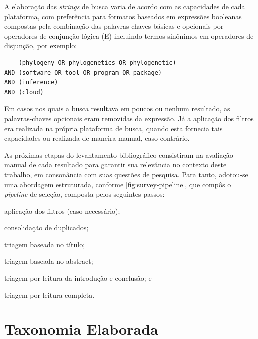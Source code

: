\documentclass[english,brazilian]{UNISINOSmonografia} %
\begin{document}
A elaboração das \textit{strings} de busca varia de acordo com as capacidades de cada plataforma, com preferência para formatos baseados em expressões booleanas compostas pela combinação das palavras-chaves básicas e opcionais por operadores de conjunção lógica (E) incluindo termos sinônimos em operadores de disjunção, por exemplo:
\begin{verbatim}
    (phylogeny OR phylogenetics OR phylogenetic) 
AND (software OR tool OR program OR package) 
AND (inference) 
AND (cloud)
\end{verbatim}
Em casos nos quais a busca resultava em poucos ou nenhum resultado, as palavras-chaves opcionais eram removidas da expressão.
Já a aplicação dos filtros era realizada na própria plataforma de busca, quando esta fornecia tais capacidades ou realizada de maneira manual, caso contrário.


%


As próximas etapas do levantamento bibliográfico consistiram na avaliação manual de cada resultado para garantir sua relevância no contexto deste trabalho, em consonância com suas questões de pesquisa.
Para tanto, adotou-se uma abordagem estruturada, conforme \autoref{fig:survey-pipeline}, que compôs o \textit{pipeline} de seleção, composta pelos seguintes passos:
\begin{inparaenum}[I)]
	\item aplicação dos filtros (caso necessário);
	\item consolidação de duplicados;
	\item triagem baseada no título;
	\item triagem baseada no abstract;
	\item triagem por leitura da introdução e conclusão; e 
	\item triagem por leitura completa.
\end{inparaenum}





\section{Taxonomia Elaborada}
\label{sec:taxonomia}
\end{document}
